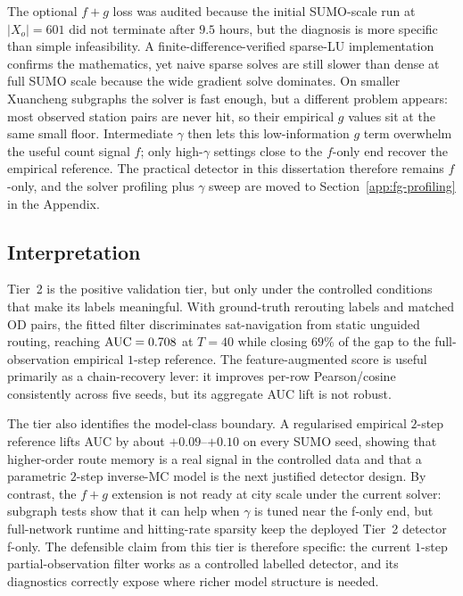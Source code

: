 The optional $f+g$ loss was audited because the initial SUMO-scale run at
$|X_o|=601$ did not terminate after $9.5$ hours, but the diagnosis is more
specific than simple infeasibility. A finite-difference-verified sparse-LU
implementation confirms the mathematics, yet naive sparse solves are still
slower than dense at full SUMO scale because the wide gradient solve
dominates. On smaller Xuancheng subgraphs the solver is fast enough, but
a different problem appears: most observed station pairs are never hit, so
their empirical $g$ values sit at the same small floor. Intermediate
$\gamma$ then lets this low-information $g$ term overwhelm the useful
count signal $f$; only high-$\gamma$ settings close to the $f$-only end
recover the empirical reference. The practical detector in this
dissertation therefore remains $f$-only, and the solver profiling plus
$\gamma$ sweep are moved to Section~\ref{app:fg-profiling} in the
Appendix.

\subsection{Interpretation}

Tier~2 is the positive validation tier, but only under the controlled
conditions that make its labels meaningful. With ground-truth rerouting
labels and matched OD pairs, the fitted filter discriminates sat-navigation
from static unguided routing, reaching $\mathrm{AUC}=0.708$ at $T=40$ while
closing $69\%$ of the gap to the full-observation empirical $1$-step
reference. The feature-augmented score is useful primarily as a
chain-recovery lever: it improves per-row Pearson/cosine consistently
across five seeds, but its aggregate AUC lift is not robust.

The tier also identifies the model-class boundary. A regularised
empirical $2$-step reference lifts AUC by about $+0.09$--$+0.10$ on every
SUMO seed, showing that higher-order route memory is a real signal in the
controlled data and that a parametric $2$-step inverse-MC model is the
next justified detector design. By contrast, the $f+g$ extension is not
ready at city scale under the current solver: subgraph tests show that it
can help when $\gamma$ is tuned near the f-only end, but full-network
runtime and hitting-rate sparsity keep the deployed Tier~2 detector
f-only. The defensible claim from this tier is therefore specific:
the current $1$-step partial-observation filter works as a controlled
labelled detector, and its diagnostics correctly expose where richer
model structure is needed.
